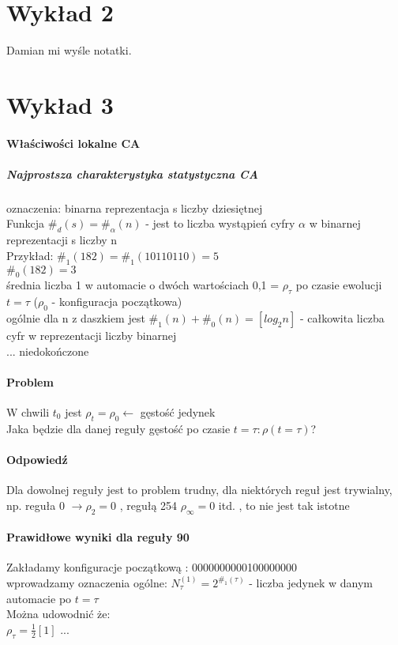 \documentclass{article}
\begin{document}
	\section{Wykład 2}
		Damian mi wyśle notatki.
	\section{Wykład 3}
		\paragraph{Właściwości lokalne CA} 
		\subparagraph{Najprostsza charakterystyka statystyczna CA} oznaczenia: binarna reprezentacja s liczby dziesiętnej \\
		Funkcja $\#_d(s) = \#_\alpha(n)$ - jest to liczba wystąpień cyfry $\alpha$ w binarnej reprezentacji s liczby n\\
		Przykład: $\#_1(182)=\#_1(10110110)=5$ \\
		$\#_0(182) = 3$\\
		średnia liczba 1 w automacie o dwóch wartościach {0,1} = $\rho_\tau$ po czasie ewolucji $t=\tau$ ($\rho_0$ - konfiguracja początkowa)\\
		ogólnie dla n z daszkiem jest $\#_1(n) + \#_0(n) = [log_2 n]$ - całkowita liczba cyfr w reprezentacji liczby binarnej\\
		... niedokończone
		 \paragraph{Problem} W chwili $t_0$ jest $\rho_t=\rho_0 \leftarrow$ gęstość jedynek \\
		 Jaka będzie dla danej reguły gęstość po czasie $t=\tau:\rho(t=\tau)$?\\
		 \paragraph{Odpowiedź} Dla dowolnej reguły jest to problem trudny, dla niektórych reguł jest trywialny, np. reguła 0 $\rightarrow \rho_2 = 0$ , regułą 254 $\rho_\infty=0$ itd. , to nie jest tak istotne
		 \paragraph{Prawidłowe wyniki dla reguły 90}
		 Zakładamy konfiguracje początkową : 0000000000100000000 \\
		 wprowadzamy oznaczenia ogólne: $N_\tau^{(1)} = 2^{\#_1(\tau)}$ - liczba jedynek w danym automacie po $t=\tau$\\
		 Można udowodnić że:\\
		 $\rho_\tau = \frac{1}{2}[1]$ ...\
\end{document}
